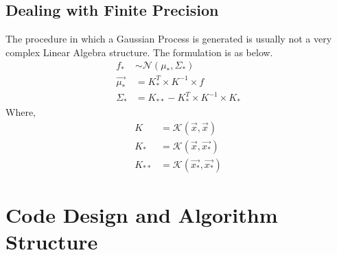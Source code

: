 \documentclass{article}
\begin{document}
\subsection{Dealing with Finite Precision}
The procedure in which a Gaussian Process is generated is usually not a very complex Linear Algebra structure. The formulation is as below. 
\begin{align*}
    f_* &\sim \mathcal{N}(\mu_*, \Sigma_*) \\
    \vec{\mu_*} &= K_*^T \times K^{-1} \times f \\
    \Sigma_* &= K_{**} - K_*^T \times K^{-1} \times K_*
\end{align*}
Where, 
\begin{align*}
    K &= \mathcal{K}(\vec{x}, \vec{x}) \\
    K_* &= \mathcal{K}(\vec{x}, \vec{x_*}) \\
    K_{**} &= \mathcal{K}(\vec{x_*}, \vec{x_*})
\end{align*}


\section{Code Design and Algorithm Structure}
\end{document}
